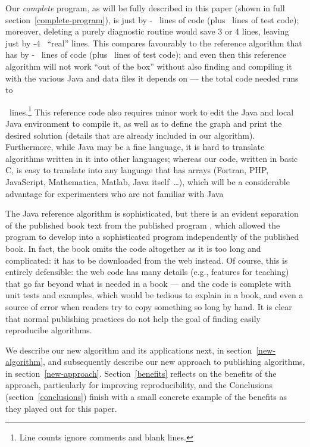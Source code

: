 \documentclass[12pt]{article}
\begin{document}
Our \emph{complete\/} program, as will be fully described in this paper (shown in full section~\ref{complete-program}), is just 
\newcount\testcode 
{} \advance\linesofcode by -\testcode
\the\linesofcode\ lines of code  (plus \the\testcode\ lines of test code); moreover, deleting a purely diagnostic routine would save 3 or 4 lines, leaving just
\advance \linesofcode by -4 \the\linesofcode\ ``real'' lines. This compares favourably to the reference algorithm \cite{sedgewickcode} that has 
 \advance\linesofcode by -\testcode
\the\linesofcode\ lines of code (plus \the\testcode\ lines of test code); and even then this reference algorithm will not work ``out of the box'' without also finding  and compiling it  with the various Java and data files it depends on --- the total code needed runs to   

\the\linesofcode\ lines.\footnote{Line counts ignore comments and blank lines.} This reference code also requires minor work to edit the Java and local Java environment to compile it, as well as to define the graph and print the desired solution (details that are already included in our algorithm). Furthermore, while Java may be a fine language, it is hard to translate algorithms written in it into other languages; whereas our code, written in basic C, is easy to translate into any language that has arrays (Fortran, PHP, JavaScript, Mathematica, Matlab, Java itself~\ldots), which will be a considerable advantage for experimenters who are not familiar with Java

The Java reference algorithm is sophisticated, but there is an evident separation of the published book text \cite{sedgewickbook} from the published program \cite{sedgewickcode}, which allowed the program to develop into a sophisticated program independently of the published book. In fact, the book \cite{sedgewickcode} omits the code altogether as it is too long and complicated: it has to be downloaded from the web instead. Of course, this is entirely defensible: the web code has many details (e.g., features for teaching) that go far beyond what is needed in a book --- and the code is complete with unit tests and examples, which would be tedious to explain in a book, and even a source of error when readers try to copy something so long by hand. It is clear that normal publishing practices do not help the goal of finding easily reproducibe algorithms. 

We describe our new algorithm and its applications next, in section~\ref{new-algorithm}, and subsequently describe our new approach to publishing algorithms, in section~\ref{new-approach}. Section~\ref{benefits} reflects on the benefits of the approach, particularly for improving reproducibility, and the Conclusions (section~\ref{conclusions}) finish with a small concrete example of the benefits as they played out for this paper.
\end{document}
